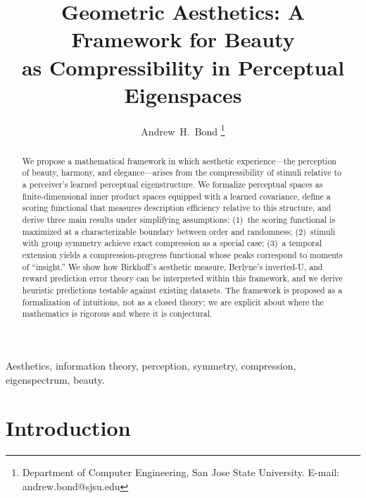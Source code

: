 \documentclass[journal]{IEEEtran}
\theoremstyle{definition}
\theoremstyle{remark}
\begin{document}
\title{Geometric Aesthetics: A Framework for Beauty\\as
Compressibility in Perceptual Eigenspaces}

\author{Andrew~H.~Bond
\thanks{Department of Computer Engineering, San Jose State University.
E-mail: andrew.bond@sjsu.edu}}


\maketitle

\begin{abstract}
We propose a mathematical framework in which aesthetic
experience---the perception of beauty, harmony, and
elegance---arises from the compressibility of stimuli relative
to a perceiver's learned perceptual eigenstructure.  We formalize
perceptual spaces as finite-dimensional inner product spaces equipped
with a learned covariance, define a scoring functional that measures
description efficiency relative to this structure, and derive three
main results under simplifying assumptions:
(1)~the scoring functional is maximized at a characterizable
boundary between order and randomness;
(2)~stimuli with group symmetry achieve exact compression as a
special case;
(3)~a temporal extension yields a compression-progress functional
whose peaks correspond to moments of ``insight.''
We show how Birkhoff's aesthetic measure, Berlyne's inverted-U,
and reward prediction error theory can be interpreted within this
framework, and we derive heuristic predictions testable against
existing datasets.  The framework is proposed as a formalization of
intuitions, not as a closed theory; we are explicit about where
the mathematics is rigorous and where it is conjectural.
\end{abstract}

\begin{IEEEkeywords}
Aesthetics, information theory, perception, symmetry, compression,
eigenspectrum, beauty.
\end{IEEEkeywords}


\section{Introduction}
\label{sec:intro}
\end{document}
